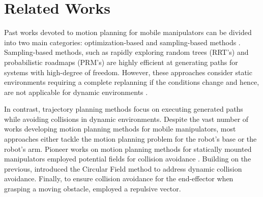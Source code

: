\section{Related Works}%
\label{sec:related_works}

\iffalse
\BF{Here you should tell a story and have a clear structure. You can organize the
approaches by time but also group them into categories, for instance: model-based,
optimization-based and learning based. You can say that the first works devoted to develop
motion planning algorithms and ensure collision avoidance were model-based ... Then you
should say their main drawbacks, for instance: "But they rely on handcrafted functions,
deadlocks dude to local minima, etc,." Then you introduce the next category of works, to
deal with a high number of dynamic obstacles \cite{VanDenBerg2011} proposed an
optimization-based method... I think you need to re-write this section again. Was my point
clear?}
\fi

Past works devoted to motion planning for mobile manipulators can be divided into two main categories: 
optimization-based and sampling-based methods \cite{LaValle2006,Mukadam2017}. Sampling-based methods, such as rapidly exploring random trees (RRT's) \cite{Webb2013,Kleinbort2019,Kuffner2000} and probabilistic roadmaps (PRM's) \cite{Hsu2002,Faust2017} are highly efficient at generating paths for systems with high-degree of freedom. However, these approaches consider static environments requiring a complete replanning if the conditions change and hence, are not applicable for dynamic environments \cite{Avanzini2018}.

In contrast, trajectory planning methods focus on executing generated paths while avoiding collisions in dynamic environments. %
Despite the vast number of works developing motion planning methods for mobile manipulators, most approaches either tackle the motion planning problem for the robot's base or the robot's arm. 
Pioneer works on motion planning methods for statically mounted manipulators employed potential fields for collision avoidance \cite{Khatib1985}.
Building on the previous, \cite{Haddadin2011} introduced the Circular Field method to address dynamic collision avoidance.
Finally, to ensure collision avoidance for the end-effector when grasping a moving obstacle, \cite{Du2018} employed a repulsive vector.

